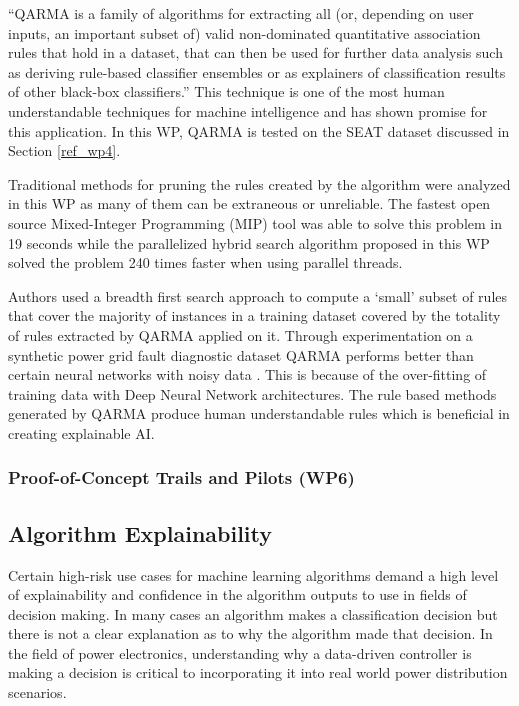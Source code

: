 \enquote{QARMA is a family of algorithms for extracting all (or, depending on user inputs, an important subset of) valid non-dominated quantitative association rules that hold in a dataset, that can then be used for further data analysis such as deriving rule-based classifier ensembles or as explainers of classification results of other black-box classifiers.}  This technique is one of the most human understandable techniques for machine intelligence and has shown promise for this application. In this WP, QARMA is tested on the SEAT dataset discussed in Section \ref{ref_wp4}.

Traditional methods for pruning the rules created by the algorithm were analyzed in this WP as many of them can be extraneous or unreliable. The fastest open source Mixed-Integer Programming (MIP) tool was able to solve this problem in 19 seconds while the parallelized hybrid search algorithm proposed in this WP solved the problem 240 times faster when using parallel threads.

Authors \cite{wp5.1} used a breadth first search approach to compute a `small' subset of rules that cover the majority of instances in a training dataset covered by the totality of rules extracted by QARMA applied on it. Through experimentation on a synthetic power grid fault diagnostic dataset QARMA performs better than certain neural networks with noisy data \parencite{ml-performance-power-trans}. This is because of the over-fitting of training data with Deep Neural Network architectures. The rule based methods generated by QARMA produce human understandable rules which is beneficial in creating explainable AI.

\subsubsection{Proof-of-Concept Trails and Pilots (WP6)}
\label{ref_wp6}


\subsection{Algorithm Explainability}

Certain high-risk use cases for machine learning algorithms demand a high level of explainability and confidence in the algorithm outputs to use in fields of decision making. In many cases an algorithm makes a classification decision but there is not a clear explanation as to why the algorithm made that decision. In the field of power electronics, understanding why a data-driven controller is making a decision is critical to incorporating it into real world power distribution scenarios.

